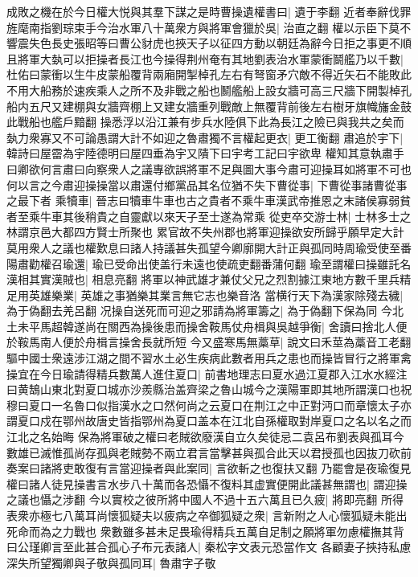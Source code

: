 成敗之機在於今日權大悦與其羣下謀之是時曹操遺權書曰|{
	遺于李翻}
近者奉辭伐罪旌麾南指劉琮束手今治水軍八十萬衆方與將軍會獵於吳|{
	治直之翻}
權以示臣下莫不響震失色長史張昭等曰曹公豺虎也挾天子以征四方動以朝廷為辭今日拒之事更不順且將軍大埶可以拒操者長江也今操得荆州奄有其地劉表治水軍蒙衝鬬艦乃以千數|{
	杜佑曰蒙衝以生牛皮蒙船覆背兩廂開掣棹孔左右有弩窗矛穴敵不得近矢石不能敗此不用大船務於速疾乘人之所不及非戰之船也鬭艦船上設女牆可高三尺牆下開製棹孔船内五尺又建棚與女牆齊棚上又建女牆重列戰敵上無覆背前後左右樹牙旗幟旛金鼓此戰船也艦戶黯翻}
操悉浮以沿江兼有步兵水陸俱下此為長江之險已與我共之矣而埶力衆寡又不可論愚謂大計不如迎之魯肅獨不言權起更衣|{
	更工衡翻}
肅追於宇下|{
	韓詩曰屋霤為宇陸德明曰屋四垂為宇又隤下曰宇考工記曰宇欲卑}
權知其意執肅手曰卿欲何言肅曰向察衆人之議專欲誤將軍不足與圖大事今肅可迎操耳如將軍不可也何以言之今肅迎操操當以肅還付鄉黨品其名位猶不失下曹從事|{
	下曹從事諸曹從事之最下者}
乘犢車|{
	晉志曰犢車牛車也古之貴者不乘牛車漢武帝推恩之末諸侯寡弱貧者至乘牛車其後稍貴之自靈獻以來天子至士遂為常乘}
從吏卒交游士林|{
	士林多士之林謂京邑大都四方賢士所聚也}
累官故不失州郡也將軍迎操欲安所歸乎願早定大計莫用衆人之議也權歎息曰諸人持議甚失孤望今卿廓開大計正與孤同時周瑜受使至番陽肅勸權召瑜還|{
	瑜已受命出使盖行未遠也使疏吏翻番蒲何翻}
瑜至謂權曰操雖託名漢相其實漢賊也|{
	相息亮翻}
將軍以神武雄才兼仗父兄之烈割據江東地方數千里兵精足用英雄樂業|{
	英雄之事猶樂其業言無它志也樂音洛}
當横行天下為漢家除殘去穢|{
	為于偽翻去羌呂翻}
况操自送死而可迎之邪請為將軍籌之|{
	為于偽翻下保為同}
今北土未平馬超韓遂尚在關西為操後患而操舍鞍馬仗舟楫與吳越爭衡|{
	舍讀曰捨北人便於鞍馬南人便於舟楫言操舍長就所短}
今又盛寒馬無藁草|{
	說文曰禾莖為藁音工老翻}
驅中國士衆遠涉江湖之間不習水土必生疾病此數者用兵之患也而操皆冒行之將軍禽操宜在今日瑜請得精兵數萬人進住夏口|{
	前書地理志曰夏水過江夏郡入江水水經注曰黄鵠山東北對夏口城亦沙羨縣治盖齊梁之魯山城今之漢陽軍即其地所謂漢口也祝穆曰夏口一名魯口似指漢水之口然何尚之云夏口在荆江之中正對沔口而章懷太子亦謂夏口戍在鄂州故唐史皆指鄂州為夏口盖本在江北自孫權取對岸夏口之名以名之而江北之名始晦}
保為將軍破之權曰老賊欲廢漢自立久矣徒忌二袁呂布劉表與孤耳今數雄已滅惟孤尚存孤與老賊勢不兩立君言當擊甚與孤合此天以君授孤也因抜刀砍前奏案曰諸將吏敢復有言當迎操者與此案同|{
	言欲斬之也復扶又翻}
乃罷會是夜瑜復見權曰諸人徒見操書言水步八十萬而各恐懾不復料其虚實便開此議甚無謂也|{
	謂迎操之議也懾之涉翻}
今以實校之彼所將中國人不過十五六萬且已久疲|{
	將即亮翻}
所得表衆亦極七八萬耳尚懷狐疑夫以疲病之卒御狐疑之衆|{
	言新附之人心懷狐疑未能出死命而為之力戰也}
衆數雖多甚未足畏瑜得精兵五萬自足制之願將軍勿慮權撫其背曰公瑾卿言至此甚合孤心子布元表諸人|{
	秦松字文表元恐當作文}
各顧妻子挾持私慮深失所望獨卿與子敬與孤同耳|{
	魯肅字子敬}
